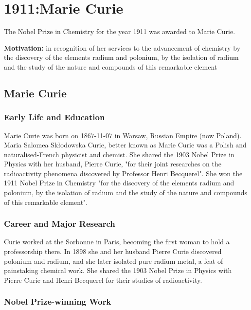 \chapter{1911:Marie Curie}
\label{chap:chemistry1911}

The Nobel Prize in Chemistry for the year 1911 was awarded to Marie Curie.

\textbf{Motivation:}
in recognition of her services to the advancement of chemistry by the discovery of the elements radium and polonium, by the isolation of radium and the study of the nature and compounds of this remarkable element

\section{Marie Curie}

\subsection*{Early Life and Education}

Marie Curie was born on 1867-11-07 in Warsaw, Russian Empire (now Poland).
Maria Salomea Skłodowska Curie, better known as Marie Curie was a Polish and naturalised-French physicist and chemist. She shared the 1903 Nobel Prize in Physics with her husband, Pierre Curie, "for their joint researches on the radioactivity phenomena discovered by Professor Henri Becquerel". She won the 1911 Nobel Prize in Chemistry "for the discovery of the elements radium and polonium, by the isolation of radium and the study of the nature and compounds of this remarkable element".

\subsection*{Career and Major Research}

Curie worked at the Sorbonne in Paris, becoming the first woman to hold a professorship there. In 1898 she and her husband Pierre Curie discovered polonium and radium, and she later isolated pure radium metal, a feat of painstaking chemical work. She shared the 1903 Nobel Prize in Physics with Pierre Curie and Henri Becquerel for their studies of radioactivity.

\subsection*{Nobel Prize-winning Work}

